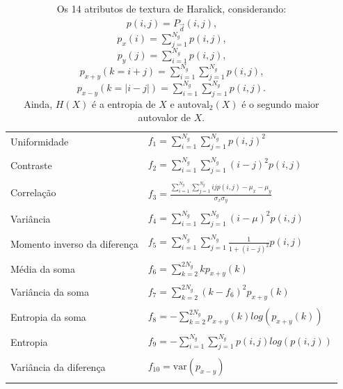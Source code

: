 \begin{table}
  \begin{center}
  \caption{\label{tab:haralick}Os 14 atributos de textura de Haralick,
    considerando: \\ $p(i,j) = P_{\vec{d}}(i,j)$, \\ $p_x(i) = \sum_{j=1}^{N_g}
    p(i,j)$, \\ $p_y(j) = \sum_{i=1}^{N_g} p(i,j)$, \\ $p_{x+y}(k=i+j) =
    \sum_{i=1}^{N_g}\sum_{j=1}^{N_g} p(i,j)$,  \\ $p_{x-y}(k=|i-j|) =
    \sum_{i=1}^{N_g}\sum_{j=1}^{N_g} p(i,j)$. \\ Ainda, $H(X)$ é a entropia de $X$
    e $\text{autoval}_2(X)$ é o segundo maior autovalor de $X$.}

  \begin{tabular}{l|l}
    \hline
    Uniformidade      & $f_1 = \sum_{i=1}^{N_g}\sum_{j=1}^{N_g}
    p(i,j)^2$ \\ \\
    Contraste         & $f_2 = \sum_{i=1}^{N_g}\sum_{j=1}^{N_g} (i-j)^2 p(i,j)$
    \\ \\
    Correlação        & $f_3 = \frac{\sum_{i=1}^{N_g}\sum_{j=1}^{N_g} i j p(i,j)
      - \mu_x - \mu_y}{\sigma_x \sigma_y}$ \\ \\
    Variância         & $f_4 = \sum_{i=1}^{N_g}\sum_{j=1}^{N_g} (i-\mu)^2 p(i,j)$
    \\ \\
    Momento inverso da diferença & $f_5 = \sum_{i=1}^{N_g}\sum_{j=1}^{N_g}
    \frac{1}{1 + (i-j)^2} p(i,j)$ \\ \\
    Média da soma     & $f_6 = \sum_{k=2}^{2 N_g} k p_{x+y}(k)$ \\ \\
    Variância da soma     & $f_7 = \sum_{k=2}^{2 N_g} (k-f_6)^2 p_{x+y}(k)$ \\ \\
    Entropia da soma     & $f_8 = -\sum_{k=2}^{2 N_g} p_{x+y}(k)
    log\left(p_{x+y}(k)\right)$ \\ \\
    Entropia             & $f_9 = -\sum_{i=1}^{N_g}\sum_{j=1}^{N_g} p(i,j)
    log\left(p(i,j)\right)$ \\ \\
    Variância da diferença & $f_{10} = \text{var}(p_{x-y})$ \\ \\

\end{tabular}
\end{center}
\end{table}
